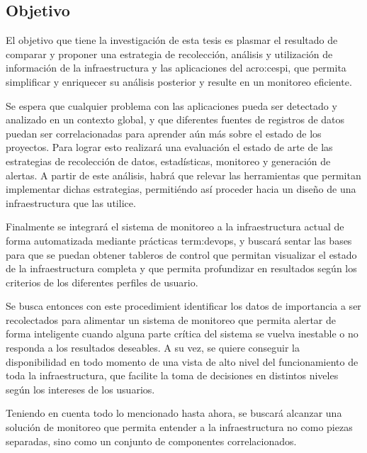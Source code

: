 \subsection{Objetivo}
\label{objetivo}

El objetivo que tiene la investigación de esta tesis es plasmar el resultado de
comparar y proponer una estrategia de recolección, análisis y utilización de
información de la infraestructura y las aplicaciones del \gls{acro:cespi}, que
permita simplificar y enriquecer su análisis posterior y resulte en un
monitoreo eficiente.

Se espera que cualquier problema con las aplicaciones pueda ser detectado y
analizado en un contexto global, y que diferentes fuentes de registros de datos
puedan ser correlacionadas para aprender aún más sobre el estado de los
proyectos. Para lograr esto realizará una evaluación el estado de arte de las
estrategias de recolección de datos, estadísticas, monitoreo y generación de
alertas.  A partir de este análisis, habrá que relevar las herramientas que
permitan implementar dichas estrategias, permitiéndo así proceder hacia un
diseño de una infraestructura que las utilice.

Finalmente se integrará el sistema de monitoreo a la infraestructura actual de
forma automatizada mediante prácticas \gls{term:devops}, y buscará sentar las
bases para que se puedan obtener tableros de control que permitan visualizar el
estado de la infraestructura completa y que permita profundizar en resultados
según los criterios de los diferentes perfiles de usuario.

Se busca entonces con este procedimient identificar los datos de importancia a
ser recolectados para alimentar un sistema de monitoreo que permita alertar de
forma inteligente cuando alguna parte crítica del sistema se vuelva inestable o
no responda a los resultados deseables. A su vez, se quiere conseguir la
disponibilidad en todo momento de una vista de alto nivel del funcionamiento de
toda la infraestructura, que facilite la toma de decisiones en distintos
niveles según los intereses de los usuarios.

Teniendo en cuenta todo lo mencionado hasta ahora, se buscará alcanzar una
solución de monitoreo que permita entender a la infraestructura no como piezas
separadas, sino como un conjunto de componentes correlacionados.
